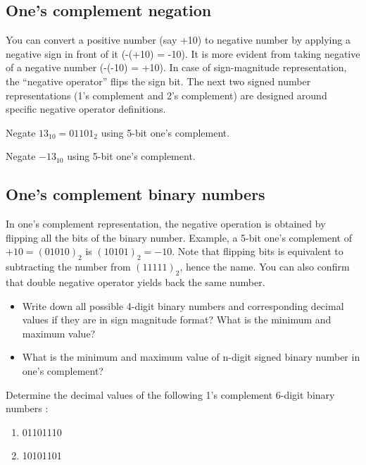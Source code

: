 \subsection{One's complement negation}

You can convert a positive number (say +10) to negative number by applying a
negative sign in front of it (-(+10) = -10). It is more evident from taking
negative of a negative number (-(-10) = +10). In case of sign-magnitude
representation, the ``negative operator'' flips the sign bit. The next two
signed number representations (1's complement and 2's complement) are designed
around specific negative operator definitions.

\noindent Negate $13_{10} = 01101_2$ using 5-bit one's complement.
\vspace{10em}

\noindent Negate $-13_{10}$ using 5-bit one's complement.
\vspace{10em}

\subsection{One's complement binary numbers}

In one's complement representation, the negative operation is obtained by flipping
all the bits of the binary number. Example, a 5-bit one's
complement of $+10 = (01010)_2$ is $(10101)_2 = -10$. Note that flipping bits is
equivalent to subtracting the number from $(11111)_2$, hence the name. You can
also confirm that double negative operator yields back the same number.

\begin{prob}
  \begin{itemize}
  \item Write down all possible 4-digit binary numbers and corresponding decimal
    values if they are in sign magnitude format? What is the minimum and maximum value?
  \item What is the minimum and maximum value of n-digit signed binary number in
    one's complement?
  \end{itemize}
\end{prob}
\vspace{20em}

\begin{prob}
  Determine the decimal values of the following 1’s complement 6-digit binary numbers :
  \begin{enumerate}
  \item 01101110
  \item 10101101
  \end{enumerate}
\end{prob}
\vspace{20em}

